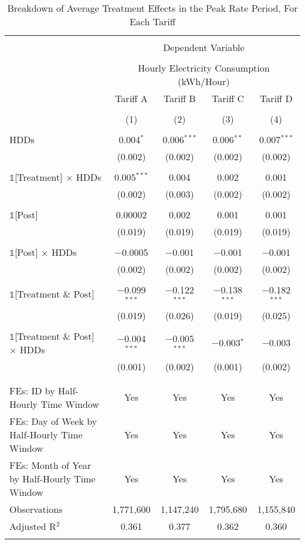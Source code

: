 
\begin{table}[!htbp] \centering 
  \caption{Breakdown of Average Treatment Effects in the Peak Rate Period, For Each Tariff} 
  \label{Table:Breakdown-of-Average-Treatment-Effects-in-the-Peak-Rate-Period} 
\small 
\begin{tabular}{@{\extracolsep{20pt}}lcccc} 
\\[-1.8ex]\hline 
\hline \\[-1.8ex] 
 & \multicolumn{4}{c}{Dependent Variable} \\ 
\cline{2-5} 
\\[-1.8ex] & \multicolumn{4}{c}{Hourly Electricity Consumption  (kWh/Hour)} \\ 
 & Tariff A & Tariff B & Tariff C & Tariff D \\ 
\\[-1.8ex] & (1) & (2) & (3) & (4)\\ 
\hline \\[-1.8ex] 
 HDDs & 0.004$^{*}$ & 0.006$^{***}$ & 0.006$^{**}$ & 0.007$^{***}$ \\ 
  & (0.002) & (0.002) & (0.002) & (0.002) \\ 
  & & & & \\ 
 $\mathbb{1}$[Treatment] $\times$ HDDs & 0.005$^{***}$ & 0.004 & 0.002 & 0.001 \\ 
  & (0.002) & (0.003) & (0.002) & (0.002) \\ 
  & & & & \\ 
 $\mathbb{1}$[Post] & 0.00002 & 0.002 & 0.001 & 0.001 \\ 
  & (0.019) & (0.019) & (0.019) & (0.019) \\ 
  & & & & \\ 
 $\mathbb{1}$[Post] $\times$ HDDs & $-$0.0005 & $-$0.001 & $-$0.001 & $-$0.001 \\ 
  & (0.002) & (0.002) & (0.002) & (0.002) \\ 
  & & & & \\ 
 $\mathbb{1}$[Treatment \& Post] & $-$0.099$^{***}$ & $-$0.122$^{***}$ & $-$0.138$^{***}$ & $-$0.182$^{***}$ \\ 
  & (0.019) & (0.026) & (0.019) & (0.025) \\ 
  & & & & \\ 
 $\mathbb{1}$[Treatment \& Post] $\times$ HDDs & $-$0.004$^{***}$ & $-$0.005$^{***}$ & $-$0.003$^{*}$ & $-$0.003 \\ 
  & (0.001) & (0.002) & (0.001) & (0.002) \\ 
  & & & & \\ 
\hline \\[-1.8ex] 
FEs: ID by Half-Hourly Time Window & Yes & Yes & Yes & Yes \\ 
FEs: Day of Week by Half-Hourly Time Window & Yes & Yes & Yes & Yes \\ 
FEs: Month of Year by Half-Hourly Time Window & Yes & Yes & Yes & Yes \\ 
Observations & 1,771,600 & 1,147,240 & 1,795,680 & 1,155,840 \\ 
Adjusted R$^{2}$ & 0.361 & 0.377 & 0.362 & 0.360 \\ 
\hline 
\hline \\[-1.8ex] 
\end{tabular} 
\end{table} 
